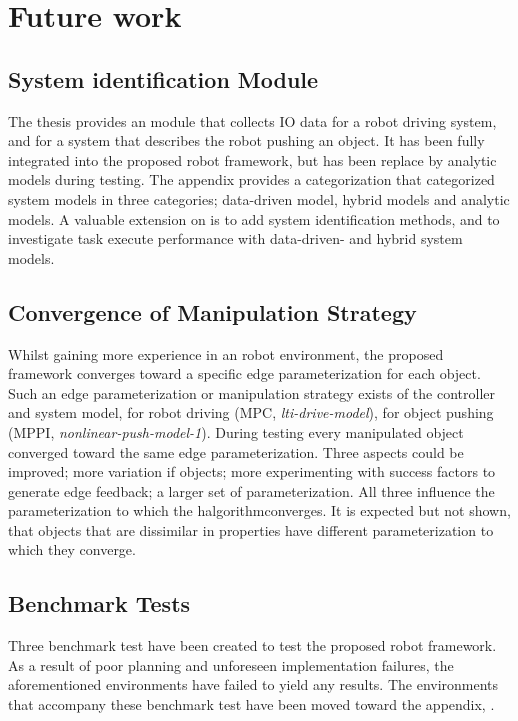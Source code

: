 \chapter{Future work}%
\label{chap:future_work}

\section*{System identification Module}
The thesis provides an module that collects \ac{IO} data for a robot driving system, and for a system that describes the robot pushing an object. It has been fully integrated into the proposed robot framework, but has been replace by analytic models during testing. The appendix provides a categorization that categorized system models in three categories; data-driven model, hybrid models and analytic models. A valuable extension on is to add system identification methods, and to investigate task execute performance with data-driven- and hybrid system models.\bs

\section*{Convergence of Manipulation Strategy}
Whilst gaining more experience in an robot environment, the proposed framework converges toward a specific edge parameterization for each object. Such an edge parameterization or manipulation strategy exists of the controller and system model, for robot driving (\ac{MPC}, \textit{lti-drive-model}), for object pushing (\ac{MPPI}, \textit{nonlinear-push-model-1}). During testing every manipulated object converged toward the same edge parameterization. Three aspects could be improved; more variation if objects; more experimenting with success factors to generate edge feedback; a larger set of parameterization. All three influence the parameterization to which the \ac{halgorithm}converges. It is expected but not shown, that objects that are dissimilar in properties have different parameterization to which they converge. 

\section*{Benchmark Tests}
Three benchmark test have been created to test the proposed robot framework. As a result of poor planning and unforeseen implementation failures, the aforementioned environments have failed to yield any results. The environments that accompany these benchmark test have been moved toward the appendix, .\bs

